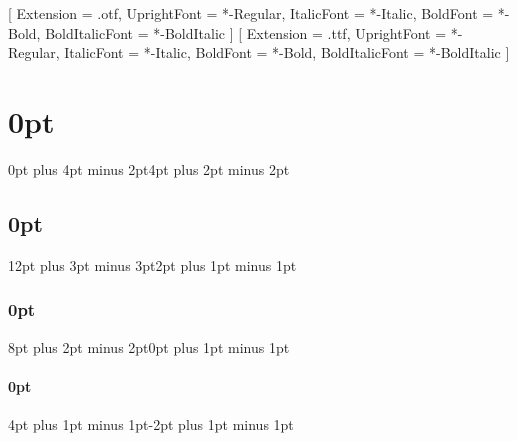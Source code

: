 \setmainfont{STIXTwoText}[
	Extension = .otf,
	UprightFont = *-Regular,
	ItalicFont = *-Italic,
	BoldFont = *-Bold,
	BoldItalicFont = *-BoldItalic
]
\setmonofont{CourierPrime}[
	Extension = .ttf,
	UprightFont = *-Regular,
	ItalicFont = *-Italic,
	BoldFont = *-Bold,
	BoldItalicFont = *-BoldItalic
]

\newfontface{}
\newfontface{}
\newfontface{}
\newfontface{}
\titleformat{\chapter}{\NeoSansProMed\huge}{\thechapter}{1em}{\raggedright}
\titleformat{\section}{\NeoSansProMed\Large}{\thesection}{1em}{\raggedright}
\titleformat{\subsection}{\NeoSansProMed\large}{\thesubsection}{1em}{\raggedright}
\titleformat{\subsubsection}{\NeoSansProMed\normalsize}{\thesubsubsection}{1em}{\raggedright}

\onehalfspacing
\setlength{\parindent}{0pt}

\titlespacing\chapter{0pt}{0pt plus 4pt minus 2pt}{4pt plus 2pt minus 2pt}
\titlespacing\section{0pt}{12pt plus 3pt minus 3pt}{2pt plus 1pt minus 1pt}
\titlespacing\subsection{0pt}{8pt plus 2pt minus 2pt}{0pt plus 1pt minus 1pt}
\titlespacing\subsubsection{0pt}{4pt plus 1pt minus 1pt}{-2pt plus 1pt minus 1pt}
\captionsetup{skip=4pt plus 1pt minus 1pt} %

